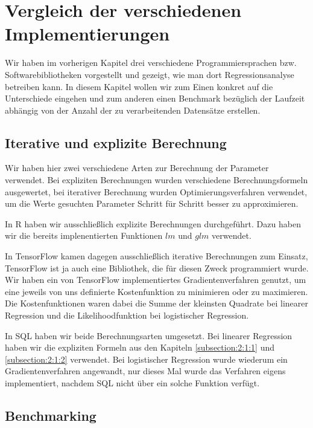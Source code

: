 \chapter{Vergleich der verschiedenen Implementierungen}
\label{chapter:4}

Wir haben im vorherigen Kapitel drei verschiedene Programmiersprachen bzw. Softwarebibliotheken vorgestellt und gezeigt, wie man dort Regressionsanalyse betreiben kann. In diesem Kapitel wollen wir zum Einen konkret auf die Unterschiede eingehen und zum anderen einen Benchmark bezüglich der Laufzeit abhängig von der Anzahl der zu verarbeitenden Datensätze erstellen.

\section{Iterative und explizite Berechnung}
\label{section:4:1}

Wir haben hier zwei verschiedene Arten zur Berechnung der Parameter verwendet. Bei expliziten Berechnungen wurden verschiedene Berechnungsformeln ausgewertet, bei iterativer Berechnung wurden Optimierungsverfahren verwendet, um die Werte gesuchten Parameter Schritt für Schritt besser zu approximieren.

In R haben wir ausschließlich explizite Berechnungen durchgeführt. Dazu haben wir die bereits implenentierten Funktionen $lm$ und $glm$ verwendet.

In TensorFlow kamen dagegen ausschließlich iterative Berechnungen zum Einsatz, TensorFlow ist ja auch eine Bibliothek, die für diesen Zweck programmiert wurde. Wir haben ein von TensorFlow implementiertes Gradientenverfahren genutzt, um eine jeweils von uns definierte Kostenfunktion zu minimieren oder zu maximieren. Die Kostenfunktionen waren dabei die Summe der kleinsten Quadrate bei linearer Regression und die Likelihoodfunktion bei logistischer Regression.

In SQL haben wir beide Berechnungsarten umgesetzt. Bei linearer Regression haben wir die expliziten Formeln aus den Kapiteln \ref{subsection:2:1:1} und \ref{subsection:2:1:2} verwendet. Bei logistischer Regression wurde wiederum ein Gradientenverfahren angewandt, nur dieses Mal wurde das Verfahren eigens implementiert, nachdem SQL nicht über ein solche Funktion verfügt.

\section{Benchmarking}
\label{section:4:2}

